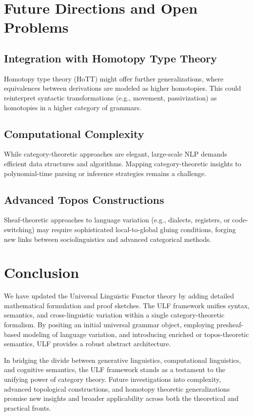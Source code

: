 \documentclass[12pt]{article}
\theoremstyle{plain}
\theoremstyle{definition}
\begin{document}
\section{Future Directions and Open Problems}

\subsection{Integration with Homotopy Type Theory}
Homotopy type theory (HoTT) might offer further generalizations, where equivalences between derivations are modeled as higher homotopies. This could reinterpret syntactic transformations (e.g., movement, passivization) as homotopies in a higher category of grammars.

\subsection{Computational Complexity}
While category-theoretic approaches are elegant, large-scale NLP demands efficient data structures and algorithms. Mapping category-theoretic insights to polynomial-time parsing or inference strategies remains a challenge.

\subsection{Advanced Topos Constructions}
Sheaf-theoretic approaches to language variation (e.g., dialects, registers, or code-switching) may require sophisticated local-to-global gluing conditions, forging new links between sociolinguistics and advanced categorical methods.

\section{Conclusion}
We have updated the Universal Linguistic Functor theory by adding detailed mathematical formulation and proof sketches. The ULF framework unifies syntax, semantics, and cross-linguistic variation within a single category-theoretic formalism. By positing an initial universal grammar object, employing presheaf-based modeling of language variation, and introducing enriched or topos-theoretic semantics, ULF provides a robust abstract architecture.

In bridging the divide between generative linguistics, computational linguistics, and cognitive semantics, the ULF framework stands as a testament to the unifying power of category theory. Future investigations into complexity, advanced topological constructions, and homotopy theoretic generalizations promise new insights and broader applicability across both the theoretical and practical fronts.
\end{document}
